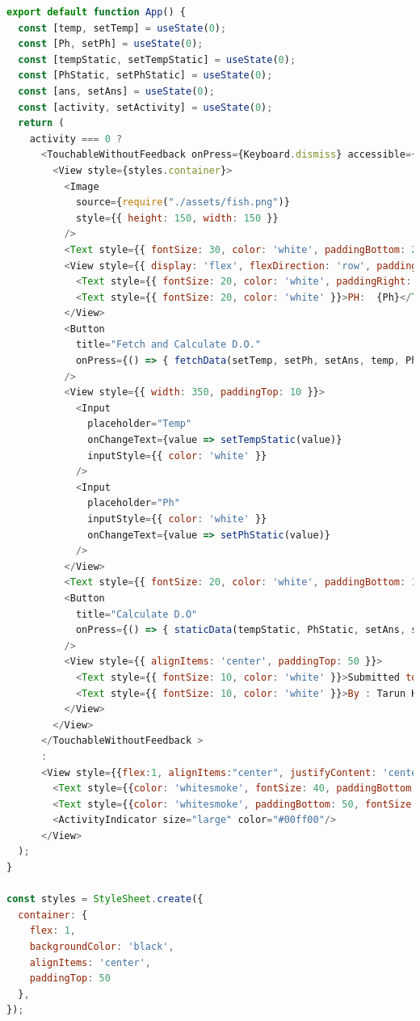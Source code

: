 \begin{lstlisting}[language=javascript, caption={Mobile App Water Monitoring}]
export default function App() {
  const [temp, setTemp] = useState(0);
  const [Ph, setPh] = useState(0);
  const [tempStatic, setTempStatic] = useState(0);
  const [PhStatic, setPhStatic] = useState(0);
  const [ans, setAns] = useState(0);
  const [activity, setActivity] = useState(0);
  return (
    activity === 0 ?
      <TouchableWithoutFeedback onPress={Keyboard.dismiss} accessible={false}>
        <View style={styles.container}>
          <Image
            source={require("./assets/fish.png")}
            style={{ height: 150, width: 150 }}
          />
          <Text style={{ fontSize: 30, color: 'white', paddingBottom: 20 }}>Water Monitoring</Text>
          <View style={{ display: 'flex', flexDirection: 'row', paddingBottom: 20 }}>
            <Text style={{ fontSize: 20, color: 'white', paddingRight: 10 }}>Temp:  {temp}</Text>
            <Text style={{ fontSize: 20, color: 'white' }}>PH:  {Ph}</Text>
          </View>
          <Button
            title="Fetch and Calculate D.O."
            onPress={() => { fetchData(setTemp, setPh, setAns, temp, Ph, setActivity) }}
          />
          <View style={{ width: 350, paddingTop: 10 }}>
            <Input
              placeholder="Temp"
              onChangeText={value => setTempStatic(value)}
              inputStyle={{ color: 'white' }}
            />
            <Input
              placeholder="Ph"
              inputStyle={{ color: 'white' }}
              onChangeText={value => setPhStatic(value)}
            />
          </View>
          <Text style={{ fontSize: 20, color: 'white', paddingBottom: 10 }}>Answer:  {ans}</Text>
          <Button
            title="Calculate D.O"
            onPress={() => { staticData(tempStatic, PhStatic, setAns, setActivity) }}
          />
          <View style={{ alignItems: 'center', paddingTop: 50 }}>
            <Text style={{ fontSize: 10, color: 'white' }}>Submitted to : Dr. Munesh Pal Singh</Text>
            <Text style={{ fontSize: 10, color: 'white' }}>By : Tarun Kantiwal</Text>
          </View>
        </View>
      </TouchableWithoutFeedback >
      :
      <View style={{flex:1, alignItems:"center", justifyContent: 'center', backgroundColor: 'black'}}>
        <Text style={{color: 'whitesmoke', fontSize: 40, paddingBottom: 10}}>Please Wait</Text>
        <Text style={{color: 'whitesmoke', paddingBottom: 50, fontSize: 20}}>Getting You Calculation Done...</Text>
        <ActivityIndicator size="large" color="#00ff00"/>
      </View>
  );
}

const styles = StyleSheet.create({
  container: {
    flex: 1,
    backgroundColor: 'black',
    alignItems: 'center',
    paddingTop: 50
  },
});


\end{lstlisting}

